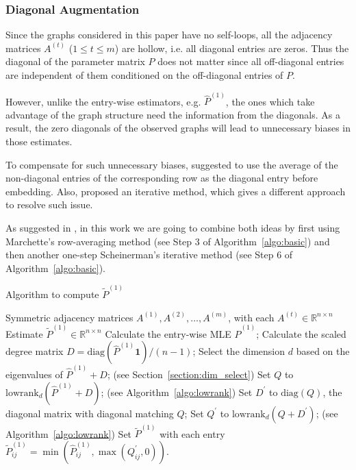 \documentclass[a4paper]{article}
\renewcommand{\hat}{\widehat}
\begin{document}
\subsubsection{Diagonal Augmentation}
\label{section:diag_aug}

Since the graphs considered in this paper have no self-loops, all the adjacency matrices $A^{(t)}$ ($1 \le t \le m$) are hollow, i.e. all diagonal entries are zeros. Thus the diagonal of the parameter matrix $P$ does not matter since all off-diagonal entries are independent of them conditioned on the off-diagonal entries of $P$.

However, unlike the entry-wise estimators, e.g. $\hat{P}^{(1)}$, the ones which take advantage of the graph structure need the information from the diagonals. As a result, the zero diagonals of the observed graphs will lead to unnecessary biases in those estimates.

To compensate for such unnecessary biases, \citet{marchette2011vertex} suggested to use the average of the non-diagonal entries of the corresponding row as the diagonal entry before embedding. Also, \citet{scheinerman2010modeling} proposed an iterative method, which gives a different approach to resolve such issue.

As suggested in \citep{tang2016law}, in this work we are going to combine both ideas by first using Marchette's row-averaging method (see Step 3 of Algorithm~\ref{algo:basic}) and then another one-step Scheinerman's iterative method (see Step 6 of Algorithm~\ref{algo:basic}).


\begin{algorithm}[H]
\caption{Algorithm to compute $\widetilde{P}^{(1)}$}
\label{algo:basic}
\begin{algorithmic}[1]
\REQUIRE Symmetric adjacency matrices $A^{(1)}, A^{(2)}, \dotsc, A^{(m)}$, with each $A^{(t)} \in \mathbb{R}^{n \times n}$
\ENSURE Estimate $\widetilde{P}^{(1)} \in \mathbb{R}^{n \times n}$
\STATE Calculate the entry-wise MLE $\hat{P}^{(1)}$;
\STATE Calculate the scaled degree matrix $D = \mathrm{diag}(\hat{P}^{(1)} \bm{1})/(n-1)$;
\STATE Select the dimension $d$ based on the eigenvalues of $\hat{P}^{(1)} + D$; (see Section~\ref{section:dim_select})
\STATE Set $Q$ to $\mathrm{lowrank}_d(\hat{P}^{(1)} + D)$; (see Algorithm~\ref{algo:lowrank})
\STATE Set $D^{\prime}$ to $ \mathrm{diag}(Q)$, the diagonal matrix with diagonal matching $Q$; 
\STATE Set $Q^{\prime}$ to $\mathrm{lowrank}_d(Q + D^{\prime})$; (see Algorithm~\ref{algo:lowrank})
\STATE Set $\widetilde{P}^{(1)}$ with each entry $\widetilde{P}^{(1)}_{ij} = \min( \hat{P}^{(1)}_{ij}, \max(Q^{\prime}_{ij}, 0))$.
\end{algorithmic}
\end{algorithm}
\end{document}
